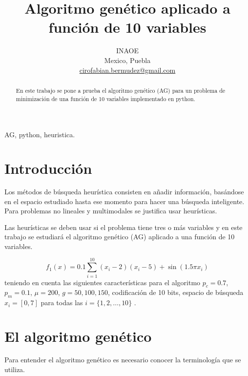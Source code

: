 \documentclass[conference]{IEEEtran}
\begin{document}
\title{Algoritmo genético aplicado a función de 10 variables\\
}

\author{
INAOE\\
Mexico, Puebla \\
\url{cirofabian.bermudez@gmail.com}
}

\maketitle

\begin{abstract}
En este trabajo se pone a prueba el algoritmo genético (AG) para  un problema de minimización de una función de 10 variables implementado en python.
\end{abstract}

\begin{IEEEkeywords}
AG, python, heuristica.
\end{IEEEkeywords}

\section{Introducción}

Los métodos de búsqueda heurística consisten en añadir información, basándose en el espacio estudiado hasta ese momento para hacer una búsqueda inteligente. Para problemas no lineales y multimodales se justifica usar heurísticas.

Las heurísticas se deben usar si el problema tiene tres o más variables y en este trabajo se estudiará el algoritmo genético (AG) aplicado a una función de 10 variables.

\begin{equation}
 f_{1}(x) = 0.1 \sum_{i=1} ^{10} (x_{i} -2)(x_{i} -5) + \sin(1.5 \pi x_{i})
 \end{equation} 
 teniendo en cuenta las siguientes características para el algoritmo $p_{c} = 0.7$, $p_{m} = 0.1$, $\mu =200 $, $g=50, 100, 150$, codificación de 10 bits, espacio de búsqueda $x_{i}  = [0,7]$ para todas las $i = \{1, 2, \ldots,10\}$ .


\section{El algoritmo genético}

Para entender el algoritmo genético es necesario conocer la terminología que se utiliza.
 
\end{document}
